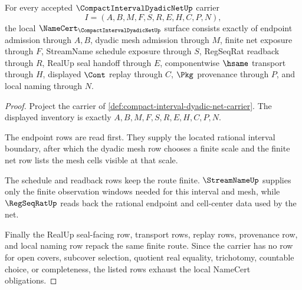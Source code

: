 \begin{theorem}
\label{thm:compact-interval-dyadic-net-namecert-obligations}
For every accepted $\CompactIntervalDyadicNetUp$ carrier
$$
I=(A,B,M,F,S,R,E,H,C,P,N),
$$
the local $\NameCert_{\CompactIntervalDyadicNetUp}$ surface consists exactly of endpoint admission through $A,B$, dyadic mesh admission through $M$, finite net exposure through $F$, StreamName schedule exposure through $S$, RegSeqRat readback through $R$, RealUp seal handoff through $E$, componentwise $\hsame$ transport through $H$, displayed $\Cont$ replay through $C$, $\Pkg$ provenance through $P$, and local naming through $N$.
\end{theorem}
\begin{proof}
Project the carrier of \autoref{def:compact-interval-dyadic-net-carrier}. The displayed inventory is exactly $A,B,M,F,S,R,E,H,C,P,N$.

The endpoint rows are read first. They supply the located rational interval boundary, after which the dyadic mesh row chooses a finite scale and the finite net row lists the mesh cells visible at that scale.

The schedule and readback rows keep the route finite. $\StreamNameUp$ supplies only the finite observation windows needed for this interval and mesh, while $\RegSeqRatUp$ reads back the rational endpoint and cell-center data used by the net.

Finally the RealUp seal-facing row, transport rows, replay rows, provenance row, and local naming row repack the same finite route. Since the carrier has no row for open covers, subcover selection, quotient real equality, trichotomy, countable choice, or completeness, the listed rows exhaust the local NameCert obligations.
\end{proof}

